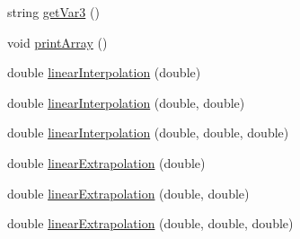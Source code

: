 \begin{DoxyCompactItemize}
string \hyperlink{classTable_aeebc708fe1dc047111875a0361f32414}{getVar3} ()
\item 
void \hyperlink{classTable_af89b1dd77f2c9d260e0df3f61be8ccb4}{printArray} ()
\item 
double \hyperlink{classTable_a2c303f18dfe78266315d3eb41de46b2d}{linearInterpolation} (double)
\item 
double \hyperlink{classTable_a620e9c1b9a15b300080d1cf41c09d1d3}{linearInterpolation} (double, double)
\item 
double \hyperlink{classTable_a9bdbd0db513790564962145543b567e4}{linearInterpolation} (double, double, double)
\item 
double \hyperlink{classTable_af1c425fcedb48c22682b71443a9fb930}{linearExtrapolation} (double)
\item 
double \hyperlink{classTable_aad46e97a758a536b87fbac3710c5b18d}{linearExtrapolation} (double, double)
\item 
double \hyperlink{classTable_a0f2374ac350a019a94e9db710eb8435c}{linearExtrapolation} (double, double, double)
\end{DoxyCompactItemize}


